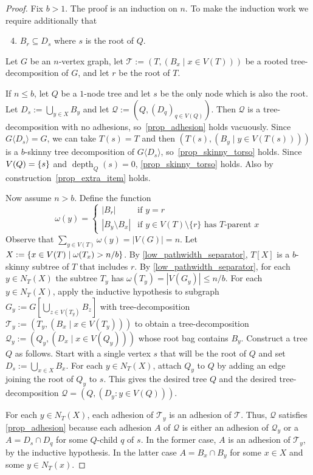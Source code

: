 \documentclass{patmorin}
\renewcommand{\le}{\leqslant}
\newcommand{\torso}[2]{{#1}\langle{#2}\rangle}
\DeclareMathOperator{\depth}{depth}
\DeclarePairedDelimiter{\set}{\{}{\}}
\newcommand{\calQ}{\mathcal{Q}}
\newcommand{\calT}{\mathcal{T}}
\begin{document}
  \begin{proof}
    Fix $b>1$.
    The proof is an induction on $n$.
    To make the induction work we require additionally that
    \begin{enumerate}[nosep,nolistsep,label=\rm(\alph*)]
    \setcounter{enumi}{3}
    \item\label{prop_extra_item} $B_r \subseteq D_s$ where $s$ is the root of $Q$.
    \end{enumerate}
    Let $G$ be an $n$-vertex graph, let $\calT:=(T,(B_x\mid x\in V(T)))$ be a rooted tree-decomposition of $G$, and let $r$ be the root of $T$.

If $n\le b$, let $Q$ be a $1$-node tree and let $s$ be the only node which is also the root.
Let $D_s:=\bigcup_{y\in X} B_y$ and let $\calQ:=(Q,(D_q)_{q\in V(Q)})$.
Then $\calQ$ is a tree-decomposition with no adhesions, so~\ref{prop_adhesion} holds vacuously.
Since $\torso{G}{D_s}=G$, we can take $T(s)=T$ and then $(T(s),(B_y\mid y\in V(T(s))))$ is a $b$-skinny tree decomposition of $\torso{G}{D_s}$,
so~\ref{prop_skinny_torso} holds.
Since $V(Q)=\set{s}$ and $\depth_Q(s)=0$, \ref{prop_skinny_torso}  holds.
Also by construction~\ref{prop_extra_item} holds.

    Now assume $n> b$.  Define the function
    \[
        \omega(y) = \begin{cases}
        |B_r| & \text{if $y=r$} \\
        |B_y\setminus B_x| & \text{if $y\in V(T)\setminus\{r\}$ has $T$-parent $x$}
        \end{cases}
    \]
    Observe that $\sum_{y\in V(T)}\omega(y)=|V(G)|=n$.
    Let $X:=\set{x\in V(T)\mid  \omega(T_x)>n/b}$.
    By \cref{low_pathwidth_separator}, $T[X]$ is a $b$-skinny subtree of $T$ that includes $r$.
    By \cref{low_pathwidth_separator}, for each $y\in N_T(X)$ the subtree $T_y$ has $\omega(T_y)=|V(G_y)|\le n/b$. For each $y\in N_T(X)$, apply the inductive hypothesis to subgraph $G_y:=G[\bigcup_{z\in V(T_y)} B_z]$ with tree-decomposition $\calT_y:=(T_y, (B_x\mid x\in V(T_y)))$ to obtain a tree-decomposition $\calQ_{y}:=(Q_y,(D_x \mid x\in V(Q_y)))$ whose root bag contains $B_y$.
    Construct a tree $Q$ as follows.
    Start with a single vertex $s$ that will be the root of $Q$ and set $D_s:=\bigcup_{x\in X} B_x$.
    For each $y\in N_T(X)$, attach $Q_y$ to $Q$ by adding an edge joining the root of $Q_y$ to $s$.
    This gives the desired tree $Q$ and the desired tree-decomposition $\calQ=(Q,(D_y:y\in V(Q)))$.

    For each $y\in N_T(X)$, each adhesion of $\calT_y$ is an adhesion of $\calT$.
    Thus, $\calQ$ satisfies \ref{prop_adhesion} because each adhesion $A$ of $\calQ$ is either an adhesion of $\calQ_y$ or a $A=D_s\cap D_{q}$ for some $Q$-child $q$ of $s$.  In the former case, $A$ is an adhesion of $\calT_y$, by the inductive hypothesis. In the latter case $A=B_x\cap B_y$ for some $x\in X$ and some $y\in N_T(x)$.




\end{proof}
\end{document}

